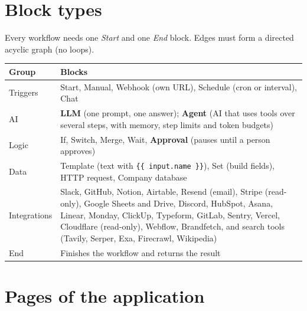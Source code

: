 \documentclass[11pt,a4paper]{article}
\begin{document}
\section{Block types}

Every workflow needs one \emph{Start} and one \emph{End} block. Edges must form a
directed acyclic graph (no loops).

\begin{longtable}{@{}L{3.6cm}L{12cm}@{}}
\toprule
\textbf{Group} & \textbf{Blocks} \\
\midrule
\endhead
Triggers & Start, Manual, Webhook (own URL), Schedule (cron or interval), Chat \\
AI & \textbf{LLM} (one prompt, one answer); \textbf{Agent} (AI that uses tools over several steps, with memory, step limits and token budgets) \\
Logic & If, Switch, Merge, Wait, \textbf{Approval} (pauses until a person approves) \\
Data & Template (text with \texttt{\{\{ input.name \}\}}), Set (build fields), HTTP request, Company database \\
Integrations & Slack, GitHub, Notion, Airtable, Resend (email), Stripe (read-only), Google Sheets and Drive, Discord, HubSpot, Asana, Linear, Monday, ClickUp, Typeform, GitLab, Sentry, Vercel, Cloudflare (read-only), Webflow, Brandfetch, and search tools (Tavily, Serper, Exa, Firecrawl, Wikipedia) \\
End & Finishes the workflow and returns the result \\
\bottomrule
\end{longtable}

\section{Pages of the application}
\end{document}
